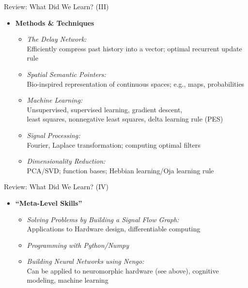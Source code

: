 \documentclass[handout,aspectratio=169]{beamer}
\begin{document}
\begin{frame}{Review: What Did We Learn? (III)}
	\begin{itemize}
		\item \textbf{Methods \& Techniques}\\[0.25cm]
		\begin{itemize}
			\setlength{\itemsep}{0.25cm}
			\item \emph{The Delay Network:}\\
			Efficiently compress past history into a vector; optimal recurrent update rule
      \item \emph{Spatial Semantic Pointers:}\\
			Bio-inspired representation of continuous spaces; e.g., maps, probabilities
      \item \emph{Machine Learning:}\\
			Unsupervised, supervised learning, gradient descent,\\least squares, nonnegative least squares, delta learning rule (PES)
			\item \emph{Signal Processing:}\\
			Fourier, Laplace transformation; computing optimal filters
			\item \emph{Dimensionality Reduction:}\\
			PCA/SVD; function bases; Hebbian learning/Oja learning rule
		\end{itemize}
	\end{itemize}
\end{frame}


\begin{frame}{Review: What Did We Learn? (IV)}
	\begin{itemize}
		\item \textbf{\enquote{Meta-Level Skills}}\\[0.25cm]
		\begin{itemize}
			\setlength{\itemsep}{0.5cm}
			\item \emph{Solving Problems by Building a Signal Flow Graph:}\\
			Applications to Hardware design, differentiable computing
			\item \emph{Programming with Python/Numpy}
			\item \emph{Building Neural Networks using Nengo:}\\
			Can be applied to neuromorphic hardware (see above), cognitive modeling, machine learning
		\end{itemize}
	\end{itemize}
\end{frame}
\end{document}
